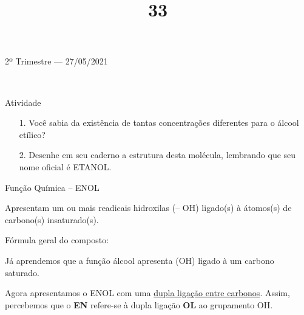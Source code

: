 \documentclass{SchoolBook}
\begin{document}
\begin{day}{2º Trimestre --- 27/05/2021}
\begin{center}
            \vspace{6pt}
             \\
            \textbf{  }
            \vspace{6pt}
            
        \end{center}
        
        \title{3}{Atividade}
        
        \begin{enumerate}
        \item[1.] Você sabia da existência de tantas concentrações diferentes para o álcool etílico?
        
        \item[2.] Desenhe em seu caderno a estrutura desta molécula, lembrando que seu nome oficial é ETANOL. \\
        \end{enumerate}
        
        \title{3}{Função Química -- ENOL}
        
        Apresentam um ou mais readicais hidroxilas (-- OH) ligado(s) à átomos(s) de carbono(s) insaturado(s).
        \vspace{12pt}
        
        \begin{center}
            Fórmula geral do composto: \\[6pt]
        \end{center}
        
        \vspace{12pt}
        Já aprendemos que a função álcool apresenta (OH) ligado à um carbono saturado.
        
        Agora apresentamos o ENOL com uma \underline{dupla ligação entre carbonos}. Assim, percebemos que o \textbf{EN} refere-se à dupla ligação \textbf{OL} ao grupamento OH.
    \end{day}
    
\end{document}
